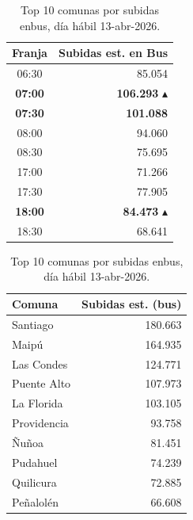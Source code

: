 \documentclass[11pt,letterpaper]{article}
\begin{document}
\begin{table}[h!]
\centering
\small
\renewcommand{\arraystretch}{1.2}
\begin{minipage}[t]{0.47\textwidth}
\centering
\begin{tabular}{@{}c r@{}}
\toprule
\rowcolor{primary!12}
\textbf{Franja} & \textbf{Subidas est. en Bus} \\
\midrule
06:30 & 85.054 \\
\textbf{07:00} & \textbf{106.293} \textcolor{secondary}{$\blacktriangle$}\\
\textbf{07:30} & \textbf{101.088} \\
08:00 & 94.060 \\
08:30 & 75.695 \\
\midrule
17:00 & 71.266 \\
17:30 & 77.905 \\
\textbf{18:00} & \textbf{84.473} \textcolor{secondary}{$\blacktriangle$}\\
18:30 & 68.641 \\
\bottomrule
\end{tabular}
\caption{Picos de demanda en bus, día hábil-abr-2026.}
\label{tab:demanda}
\end{minipage}\hfill
\begin{minipage}[t]{0.47\textwidth}
\centering
\begin{tabular}{@{}l r@{}}
\toprule
\rowcolor{primary!12}
\textbf{Comuna} & \textbf{Subidas est. (bus)} \\
\midrule
Santiago     & 180.663 \\
Maipú        & 164.935 \\
Las Condes   & 124.771 \\
Puente Alto  & 107.973 \\
La Florida   & 103.105 \\
Providencia  &  93.758 \\
Ñuñoa        &  81.451 \\
Pudahuel     &  74.239 \\
Quilicura    &  72.885 \\
Peñalolén    &  66.608 \\
\bottomrule
\end{tabular}
\caption{Top 10 comunas por subidas en\newline bus, día hábil 13-abr-2026.}
\label{tab:comunas}
\end{minipage}
\end{table}
\end{document}
